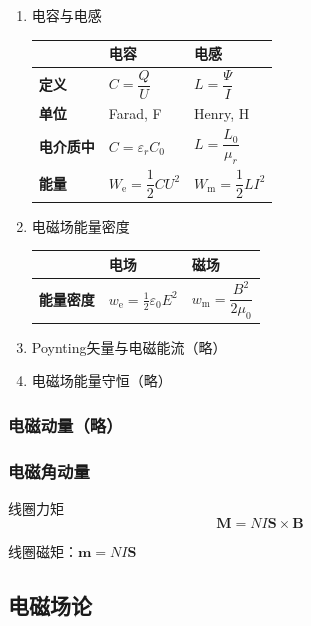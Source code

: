 \documentclass[UTF8,fontset=fandol,zihao=5]{ctexart}
\newcommand{\vect}[1]{\bm{#1}}
\begin{document}
\begin{enumerate}
  \item 电容与电感

  \begin{center}
  \begin{tabularx}{0.98\textwidth}{>{\bfseries}p{1.5cm}X X}
  \toprule
  & 电容 & 电感 \\
  \midrule
  定义 & $C=\dfrac{Q}{U}$  & $L=\dfrac{\varPsi}{I}$ \\
  单位 & Farad, F & Henry, H \\
  电介质中 & $C=\varepsilon_r C_0$ & $L=\dfrac{L_0}{\mu_r}$ \\
  能量 & $W_{\mathrm e} = \dfrac{1}{2}CU^2$ & $W_{\mathrm m} = \dfrac{1}{2}LI^2$ \\
  \bottomrule
  \end{tabularx}
  \end{center}

  \item 电磁场能量密度

  \begin{center}
  \begin{tabularx}{0.98\textwidth}{>{\bfseries}p{1.5cm}X X}
  \toprule
  & 电场 & 磁场 \\
  \midrule
  能量密度 & $w_{\mathrm e}=\frac{1}{2}\varepsilon_0E^2$  & $w_{\mathrm m}=\dfrac{B^2}{2\mu_0}$ \\
  \bottomrule
  \end{tabularx}
\end{center}

  \item Poynting矢量与电磁能流（略）
  \item 电磁场能量守恒（略）
\end{enumerate}

\subsubsection{电磁动量（略）}
\subsubsection{电磁角动量}

线圈力矩
\[
\vect M=N I \vect S \times \vect B
\]

线圈磁矩：$\vect m=N I\vect S$

\subsection{电磁场论}
\end{document}
